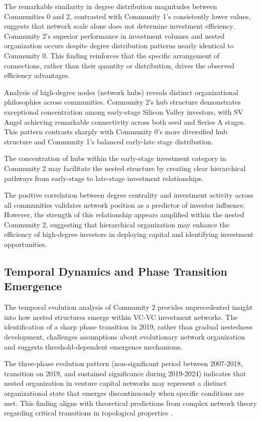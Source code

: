 The remarkable similarity in degree distribution magnitudes between Communities 0 and 2, contrasted with Community 1's consistently lower values, suggests that network scale alone does not determine investment efficiency. Community 2's superior performance in investment volumes and nested organization occurs despite degree distribution patterns nearly identical to Community 0. This finding reinforces that the specific arrangement of connections, rather than their quantity or distribution, drives the observed efficiency advantages.

Analysis of high-degree nodes (network hubs) reveals distinct organizational philosophies across communities. Community 2's hub structure demonstrates exceptional concentration among early-stage Silicon Valley investors, with SV Angel achieving remarkable connectivity across both seed and Series A stages. This pattern contrasts sharply with Community 0's more diversified hub structure and Community 1's balanced early-late stage distribution. 

The concentration of hubs within the early-stage investment category in Community 2 may facilitate the nested structure by creating clear hierarchical pathways from early-stage to late-stage investment relationships.

The positive correlation between degree centrality and investment activity across all communities validates network position as a predictor of investor influence. However, the strength of this relationship appears amplified within the nested Community 2, suggesting that hierarchical organization may enhance the efficiency of high-degree investors in deploying capital and identifying investment opportunities.

\subsection{Temporal Dynamics and Phase Transition Emergence}


The temporal evolution analysis of Community 2 provides unprecedented insight into how nested structures emerge within VC-VC investment networks. The identification of a sharp phase transition in 2019, rather than gradual nestedness development, challenges assumptions about evolutionary network organization and suggests threshold-dependent emergence mechanisms.

The three-phase evolution pattern (non-significant period between 2007-2018, transition on 2019, and sustained significance during 2019-2024) indicates that nested organization in venture capital networks may represent a distinct organizational state that emerges discontinuously when specific conditions are met. This finding aligns with theoretical predictions from complex network theory regarding critical transitions in topological properties \cite{Mariani2019}.

